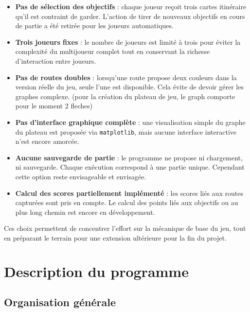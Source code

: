 \documentclass[a4paper,12pt]{report}
\begin{document}
\begin{itemize}
    \item \textbf{Pas de sélection des objectifs} : chaque joueur reçoit trois cartes itinéraire qu’il est contraint de
    garder. L’action de tirer de nouveaux objectifs en cours de partie a été retirée pour les joueurs automatiques.

    \item \textbf{Trois joueurs fixes} : le nombre de joueurs est limité à trois pour éviter la complexité du
    multijoueur complet tout en conservant la richesse d’interaction entre joueurs.

    \item \textbf{Pas de routes doubles} : lorsqu’une route propose deux couleurs dans la version réelle du jeu, seule
    l’une est disponible. Cela évite de devoir gérer les graphes complexe. (pour la création du plateau de jeu, le graph
    comporte pour le moment 2 fleches)

    \item \textbf{Pas d’interface graphique complète} : une visualisation simple du graphe du plateau est proposée via
    \texttt{matplotlib}, mais aucune interface interactive n’est encore amorcée.

    \item \textbf{Aucune sauvegarde de partie} : le programme ne propose ni chargement, ni sauvegarde.
    Chaque exécution correspond à une partie unique. Cependant cette option reste envisageable et envisagée.

    \item \textbf{Calcul des scores partiellement implémenté} : les scores liés aux routes capturées sont pris en compte.
    Le calcul des points liés aux objectifs ou au plus long chemin est encore en développement.
\end{itemize}

Ces choix permettent de concentrer l’effort sur la mécanique de base du jeu, tout en préparant le terrain pour une
extension ultérieure pour la fin du projet.

\chapter{Description du programme}

\section{Organisation générale}
\end{document}
